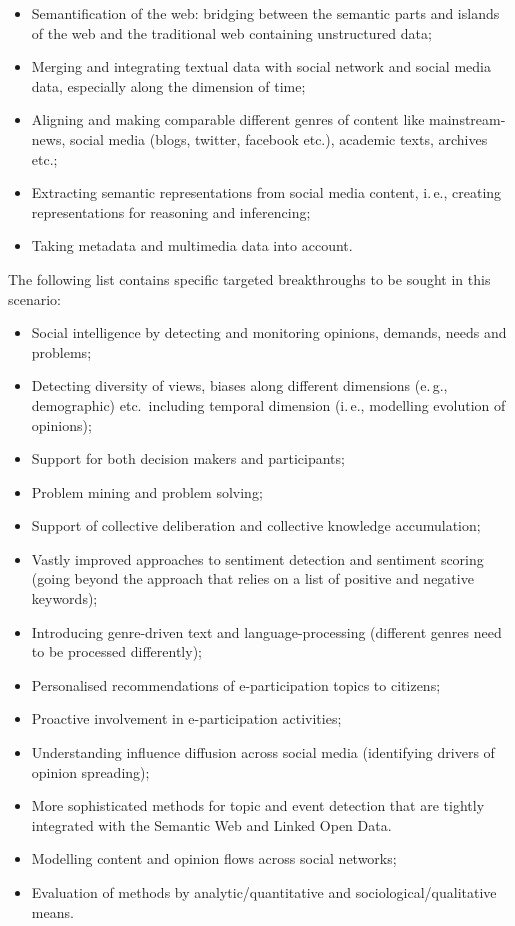 \documentclass[10pt, plain]{../../metanetpaper}
\begin{document}
\begin{multicols}{2}
\begin{itemize}
\item Semantification of the web: bridging between the semantic parts and islands of the web and the traditional web containing unstructured data;
\item Merging and integrating textual data with social network and social media data, especially along the dimension of time;
\item Aligning and making comparable different genres of content like mainstream-news, social media (blogs, twitter, facebook etc.), academic texts, archives etc.;
\item Extracting semantic representations from social media content, i.\,e., creating representations for reasoning and inferencing;
\item Taking metadata and multimedia data into account.
\end{itemize}

The following list contains specific targeted breakthroughs to be sought in this scenario:

\begin{itemize}
\item Social intelligence by detecting and monitoring opinions, demands, needs and problems;
\item Detecting diversity of views, biases along different dimensions (e.\,g., demographic) etc.~including temporal dimension (i.\,e., modelling evolution of opinions);
\item Support for both decision makers and participants;
\item Problem mining and problem solving;
\item Support of collective deliberation and collective knowledge accumulation;
\item Vastly improved approaches to sentiment detection and sentiment scoring (going beyond the approach that relies on a list of positive and negative keywords);
\item Introducing genre-driven text and language-processing (different genres need to be processed differently);
\item Personalised recommendations of e-participation topics to citizens;
\item Proactive involvement in e-participation activities;
\item Understanding influence diffusion across social media (identifying drivers of opinion spreading);
\item More sophisticated methods for topic and event detection that are tightly integrated with the Semantic Web and Linked Open Data.
\item Modelling content and opinion flows across social networks;
\item Evaluation of methods by analytic/quantitative and sociological/qualitative means.
\end{itemize}


\end{multicols}
\end{document}
